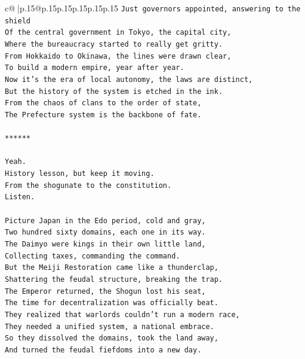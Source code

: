 \documentclass{article}
\begin{document}
{\begin{supertabular}{c@{$\;$}|p{.15\linewidth}@{}p{.15\linewidth}p{.15\linewidth}p{.15\linewidth}p{.15\linewidth}p{.15\linewidth}}
{{{\texttt{Just governors appointed, answering to the shield} \\
\texttt{Of the central government in Tokyo, the capital city,} \\
\texttt{Where the bureaucracy started to really get gritty.} \\
\texttt{From Hokkaido to Okinawa, the lines were drawn clear,} \\
\texttt{To build a modern empire, year after year.} \\
\texttt{Now it's the era of local autonomy, the laws are distinct,} \\
\texttt{But the history of the system is etched in the ink.} \\
\texttt{From the chaos of clans to the order of state,} \\
\texttt{The Prefecture system is the backbone of fate.} \\
\\ 
\texttt{******} \\
\\ 
\texttt{Yeah.} \\
\texttt{History lesson, but keep it moving.} \\
\texttt{From the shogunate to the constitution.} \\
\texttt{Listen.} \\
\\ 
\texttt{Picture Japan in the Edo period, cold and gray,} \\
\texttt{Two hundred sixty domains, each one in its way.} \\
\texttt{The Daimyo were kings in their own little land,} \\
\texttt{Collecting taxes, commanding the command.} \\
\texttt{But the Meiji Restoration came like a thunderclap,} \\
\texttt{Shattering the feudal structure, breaking the trap.} \\
\texttt{The Emperor returned, the Shogun lost his seat,} \\
\texttt{The time for decentralization was officially beat.} \\
\texttt{They realized that warlords couldn't run a modern race,} \\
\texttt{They needed a unified system, a national embrace.} \\
\texttt{So they dissolved the domains, took the land away,} \\
\texttt{And turned the feudal fiefdoms into a new day.} \\
}}}
\end{supertabular}}
\end{document}
